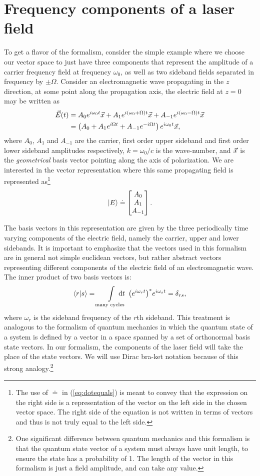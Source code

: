 \section{Frequency components of a laser field}
\label{sec:freqspace}
To get a flavor of the formalism, consider the simple example where we choose our vector space to just have three components that represent the amplitude of a carrier frequency field at frequency $\omega_0$, as well as two sideband fields separated in frequency by $\pm\Omega$. %
Consider an electromagnetic wave propagating in the $z$ direction, at some point along the propagation axis, the electric field at $z=0$ may be written as
\begin{align*}
\vec{E}(t) &= A_0 e^{i\omega_0t}\vec{x} + A_1e^{i(\omega_0+\Omega)t}\vec{x} + A_{-1}e^{i(\omega_0-\Omega)t}\vec{x}\\
&= \left( A_0 + A_1 e^{i\Omega t}+A_{-1}e^{-i\Omega t}\right) e^{i\omega_0 t}\vec{x},
\end{align*}
where $A_0$, $A_1$ and $A_{-1}$ are the carrier, first order upper sideband and first order lower sideband amplitudes respectively, $k=\omega_0/c$ is the wave-number, and $\vec{x}$ is the \emph{geometrical} basis vector pointing along the axis of polarization. %
We are interested in the vector representation where this same propagating field is represented as\footnote{The use of $\doteq$ in (\ref{eq:dotequals}) is meant to convey that the expression on the right side is a representation of the vector on the left side in the chosen vector space. %
The right side of the equation is not written in terms of vectors and thus is not truly equal to the left side.} 
\begin{equation}
\label{eq:dotequals}
\left| E \right> \doteq \left[\begin{matrix} A_0 \\ A_1 \\ A_{-1} \end{matrix}\right].
\end{equation}

The basis vectors in this representation are given by the three periodically time varying components of the electric field, namely the carrier, upper and lower sidebands. %
It is important to emphasize that the vectors used in this formalism are in general not simple euclidean vectors, but rather abstract vectors representing different components of the electric field of an electromagnetic wave. %
The inner product of two basis vectors is:
\[
\inprod{r}{s} = \int\limits_{\text{many cycles}}\! \! \! \! \! \! \! \! \!
\dd t \; \: {\left( e^{i\omega_{r}t}\right)^*}e^{i\omega_{s}t} = \delta_{rs},
\]
where $\omega_r$ is the sideband frequency of the $r$th sideband. %
This treatment is analogous to the formalism of quantum mechanics in which the quantum state of a system is defined by a vector in a space spanned by a set of orthonormal basis state vectors. %
In our formalism, the components of the laser field will take the place of the state vectors. %
We will use Dirac bra-ket notation because of this strong analogy.\footnote{One significant difference between quantum mechanics and this formalism is that the quantum state vector of a system must always have unit length, to ensure the state has a probability of 1. %
The length of the vector in this formalism is just a field amplitude, and can take any value.}

